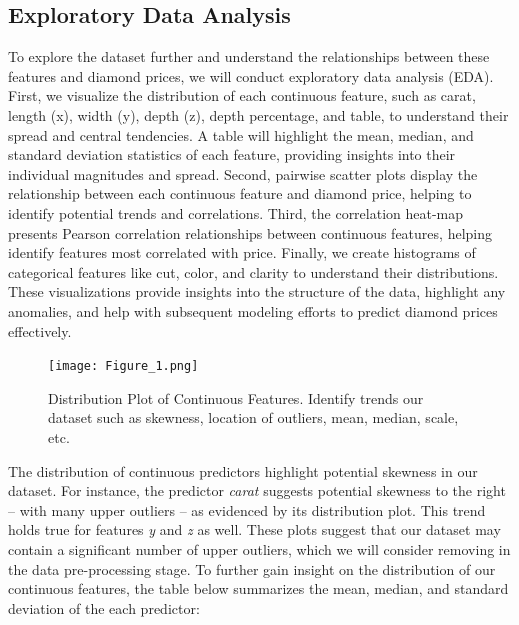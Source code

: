 \documentclass[conference]{IEEEtran}
\begin{document}
\subsection{Exploratory Data Analysis}

To explore the dataset further and understand the relationships between these features and diamond prices, we will conduct exploratory data analysis (EDA). First, we visualize the distribution of each continuous feature, such as carat, length (x), width (y), depth (z), depth percentage, and table, to understand their spread and central tendencies. A table will highlight the mean, median, and standard deviation statistics of each feature, providing insights into their individual magnitudes and spread. Second, pairwise scatter plots display the relationship between each continuous feature and diamond price, helping to identify potential trends and correlations. Third, the correlation heat-map presents Pearson correlation relationships between continuous features, helping identify features most correlated with price. Finally, we create histograms of categorical features like cut, color, and clarity to understand their distributions. These visualizations provide insights into the structure of the data, highlight any anomalies, and help with subsequent modeling efforts to predict diamond prices effectively.

\begin{figure}[H]
    \centering
    \texttt{[image: Figure\_1.png]}
    \caption{Distribution Plot of Continuous Features. Identify trends our dataset such as skewness, location of outliers, mean, median, scale, etc.}
    \label{fig:image_label}
\end{figure}

The distribution of continuous predictors highlight potential skewness in our dataset. For instance, the predictor \emph{carat} suggests potential skewness to the right – with many upper outliers – as evidenced by its distribution plot. This trend holds true for features \emph{y} and \emph{z} as well. These plots suggest that our dataset may contain a significant number of upper outliers, which we will consider removing in the data pre-processing stage. To further gain insight on the distribution of our continuous features, the table below summarizes the mean, median, and standard deviation of the each predictor:
\end{document}
